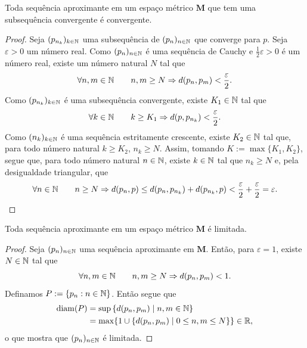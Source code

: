 \begin{prop}
Toda sequência aproximante em um espaço métrico $\bm M$ que tem uma subsequência convergente é convergente.
\end{prop}
\begin{proof}
	Seja $(p_{n_k})_{k \in \mathbb{N}}$ uma subsequência de $(p_n)_{n \in \mathbb{N}}$ que converge  para $p$. Seja $\varepsilon > 0$ um número real. Como $(p_n)_{n \in \mathbb{N}}$ é uma sequência de Cauchy e $\frac{1}{2}\varepsilon > 0$ é um número real, existe um número natural $N$ tal que
	\begin{equation*}
	\forall n,m \in \mathbb{N} \qquad n,m \geq N \Rightarrow d(p_n,p_m) < \frac{\varepsilon}{2}.
	\end{equation*}
Como $(p_{n_k})_{k \in \mathbb{N}}$ é uma subsequência convergente, existe $K_1 \in \mathbb{N}$ tal que
	\begin{equation*}
	\forall k \in \mathbb{N} \qquad k \geq K_1 \Rightarrow d(p,p_{n_k}) < \frac{\varepsilon}{2}.
	\end{equation*}
Como $(n_k)_{k \in \mathbb{N}}$ é uma sequência estritamente crescente, existe $K_2 \in \mathbb{N}$ tal que, para todo número natural $k \geq K_2$, $n_k \geq N$. Assim, tomando $K := \max\{K_1,K_2\}$, segue que, para todo número natural $n \in \mathbb{N}$, existe $k \in \mathbb{N}$ tal que $n_k \geq N$ e,  pela desigualdade triangular, que
	\begin{equation*}
	\forall n \in \mathbb{N} \qquad n \geq N \Rightarrow d(p_n,p) \leq d(p_n,p_{n_k}) + d(p_{n_k},p) < \frac{\varepsilon}{2}+\frac{\varepsilon}{2}=\varepsilon.
	\end{equation*}
\end{proof}

\begin{prop}
Toda sequência aproximante em um espaço métrico $\bm M$ é limitada.
\end{prop}
\begin{proof}
Seja $(p_n)_{n \in \mathbb{N}}$ uma sequência aproximante em $\bm M$. Então, para $\varepsilon=1$, existe $N \in \mathbb{N}$ tal que
	\begin{equation*}
	\forall n,m \in \mathbb{N} \qquad n,m \geq N \Rightarrow d(p_n,p_m)<1.
	\end{equation*}
	Definamos $P := \{p_n : n \in \mathbb{N}\}$. Então segue que
	\begin{align*}
	\operatorname{diam}(P) &= \sup \left\{d(p_n,p_m) \;\middle\vert\; n,m \in \mathbb{N} \right\} \\
		&= \max\{1 \cup \left\{d(p_n,p_m) \;\middle\vert\; 0 \leq n,m \leq N \right\}\} \in \mathbb{R},
	\end{align*}
o que mostra que $(p_n)_{n \in \mathbb{N}}$ é limitada.
\end{proof}

